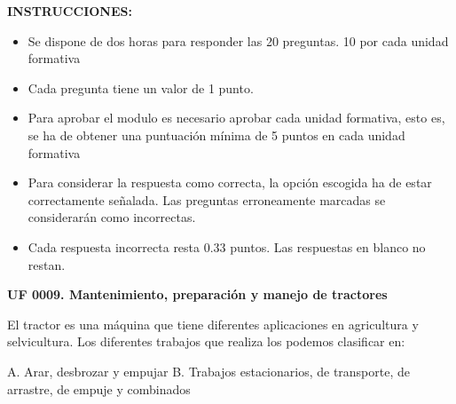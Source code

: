\documentclass[11pt]{exam}
\begin{document}
{\selectfont
\textbf{INSTRUCCIONES:}
\begin{itemize}
    \item Se dispone de dos horas para responder las 20 preguntas. 10 por cada unidad formativa
    \item Cada pregunta tiene un valor de 1 punto.
    \item Para aprobar el modulo es necesario aprobar cada unidad formativa,
      esto es, se ha de obtener una puntuación mínima de 5 puntos en cada unidad
      formativa 
    \item Para considerar la respuesta como correcta, la opción escogida ha de
      estar correctamente señalada. Las preguntas erroneamente marcadas se
      considerarán como incorrectas. 
    \item Cada respuesta incorrecta resta 0.33 puntos. Las respuestas en blanco no restan. 
\end{itemize}
\vspace{1cm}
\textbf{UF 0009. Mantenimiento, preparación y manejo de tractores}
\begin{questions}
\question El tractor es una máquina que tiene diferentes aplicaciones en agricultura y selvicultura. Los diferentes trabajos que realiza los podemos clasificar en:
\begin{checkboxes}
\choice A. Arar, desbrozar y empujar
\CorrectChoice B. Trabajos estacionarios, de transporte, de arrastre, de empuje y combinados
\end{checkboxes}

\end{questions} }
\end{document}
